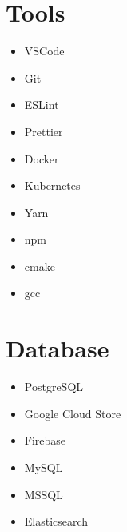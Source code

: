 \documentclass[11pt]{amsart}
\begin{document}
\hypertarget{x-tools}{\section*{Tools}}
\begin{itemize}

\item VSCode

\item Git

\item ESLint

\item Prettier

\item Docker

\item Kubernetes

\item Yarn

\item npm

\item cmake

\item gcc

\end{itemize}


\hypertarget{x-database}{\section*{Database}}
\begin{itemize}

\item PostgreSQL

\item Google Cloud Store

\item Firebase

\item MySQL

\item MSSQL

\item Elasticsearch

\end{itemize}
\end{document}
